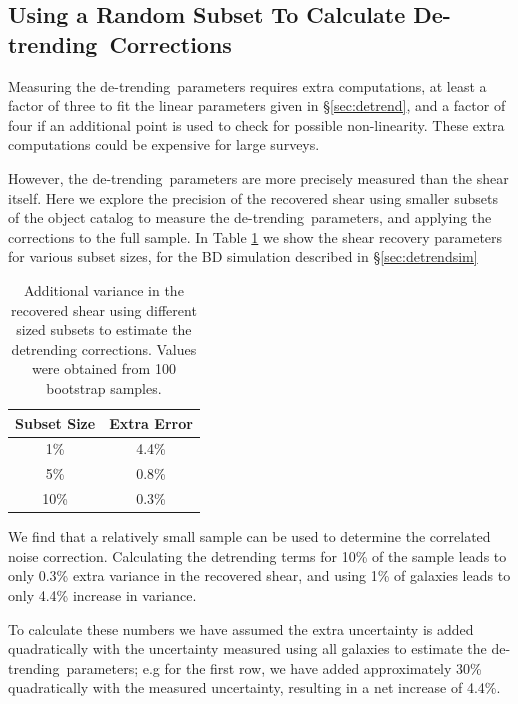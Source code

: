 \documentclass[usegraphicx,usenatbib]{mn2e}
\newcommand{\detrend}{de-trending}
\newcommand{\Detrend}{De-trending}
\begin{document}
\subsection{Using a Random Subset To Calculate \Detrend\ Corrections}

Measuring the \detrend\ parameters requires extra computations, at least a
factor of three to fit the linear parameters given in \S \ref{sec:detrend}, and
a factor of four if an additional point is used to check for possible
non-linearity. These extra computations could be expensive for large surveys.  

However, the \detrend\ parameters are more precisely measured than the shear
itself.  Here we explore the precision of the recovered shear using smaller
subsets of the object catalog to measure the \detrend\ parameters, and
applying the corrections to the full sample.  In Table \ref{tab:subsets}
we show the shear recovery parameters for various subset sizes, for the
BD simulation described in \S \ref{sec:detrendsim}

\begin{table}
    \centering
    \caption{Additional variance in the recovered shear 
        using different sized subsets to
        estimate the detrending corrections.  Values were obtained
        from 100 bootstrap samples. \label{tab:subsets}}
    \begin{tabular}{| c | c |}
        Subset Size & Extra Error \\
        \hline
        1\% & 4.4\% \\
        5\% & 0.8\% \\
        10\% & 0.3\% \\
    \end{tabular}
\end{table}


We find that a relatively small sample can be used to determine the correlated
noise correction.  Calculating the detrending terms for 10\% of the sample
leads to only 0.3\% extra variance in the recovered shear, and using 1\% of
galaxies leads to only 4.4\% increase in variance.

To calculate these numbers we have assumed the extra uncertainty is added
quadratically with the uncertainty measured using all galaxies to estimate the
\detrend\ parameters; e.g for the first row, we have added approximately 30\%
quadratically with the measured uncertainty, resulting in a net increase of
4.4\%.
\end{document}
